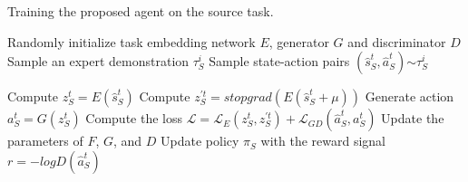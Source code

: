     \begin{algorithm}[H]
      \caption{Training the proposed agent on the source task.\label{ch:DTAIL:algo:Training}}
      \begin{algorithmic}[1]
        \Input
        \EndInput

        \State Randomly initialize task embedding network $E$, generator $G$ and discriminator $D$
        \State Sample an expert demonstration $\tau^i_S$
        \State Sample state-action pairs $(\hat{s}^t_S, \hat{a}^t_S)$$\sim$$\tau^i_S$

            \State Compute $z^t_S = E(\hat{s}^t_S)$
            \State Compute $z^{\prime t}_S = stopgrad(E(\hat{s}^t_S + \mu))$
            \State Generate action $a^t_S = G(z^t_S)$
            \State Compute the loss $\mathcal{L} = \mathcal{L}_E(z^t_S, z^{\prime t}_S) + \mathcal{L}_{GD}(\hat{a}^t_S, a^t_S)$
            \State Update the parameters of $F$, $G$, and $D$
            \State Update policy $\pi_{S}$ with the reward signal $r=-logD(\hat{a}^t_S)$
        \EndFor

        \Output
        \EndOutput
      \end{algorithmic}
    \end{algorithm}



